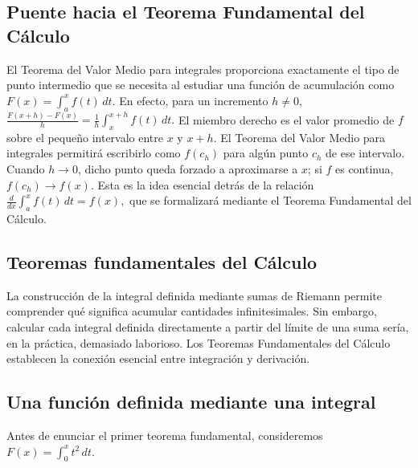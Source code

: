 \documentclass[12pt]{article}
\begin{document}
\subsection*{Puente hacia el Teorema Fundamental del Cálculo}
El Teorema del Valor Medio para integrales proporciona exactamente el tipo de
punto intermedio que se necesita al estudiar una función de acumulación como
$
F(x)=\int_a^x f(t)\,dt.
$
En efecto, para un incremento $h\ne0$,
$
\frac{F(x+h)-F(x)}{h}
=
\frac1h\int_x^{x+h}f(t)\,dt.
$
El miembro derecho es el valor promedio de $f$ sobre el pequeño intervalo
entre $x$ y $x+h$. El Teorema del Valor Medio para integrales permitirá
escribirlo como $f(c_h)$ para algún punto $c_h$ de ese intervalo. Cuando
$h\to0$, dicho punto queda forzado a aproximarse a $x$; si $f$ es continua,
$f(c_h)\to f(x)$. Esta es la idea esencial detrás de la relación
$
\frac{d}{dx}\int_a^x f(t)\,dt=f(x),
$
que se formalizará mediante el Teorema Fundamental del Cálculo.

\subsection*{Teoremas fundamentales del Cálculo}
La construcción de la integral definida mediante sumas de Riemann permite
comprender qué significa acumular cantidades infinitesimales. Sin embargo,
calcular cada integral definida directamente a partir del límite de una suma
sería, en la práctica, demasiado laborioso. Los Teoremas Fundamentales del
Cálculo establecen la conexión esencial entre integración y derivación.
\subsection*{Una función definida mediante una integral}
Antes de enunciar el primer teorema fundamental, consideremos
$
F(x)=\int_0^x t^2\,dt.
$
\end{document}
